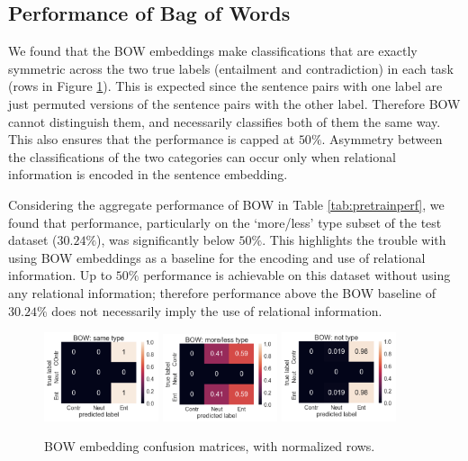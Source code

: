 \subsection{Performance of Bag of Words}
We found that the BOW embeddings make classifications that are exactly symmetric across the two true labels (entailment and contradiction) in each task (rows in Figure \ref{fig:BOWhist}). This is expected since the sentence pairs with one label are just permuted versions of the sentence pairs with the other label. Therefore BOW cannot distinguish them, and necessarily classifies both of them the same way. This also ensures that the performance is capped at $50\%$. Asymmetry between the classifications of the two categories can occur only when relational information is encoded in the sentence embedding.

Considering the aggregate performance of BOW in Table \ref{tab:pretrainperf}, we found that performance, particularly on the `more/less' type subset of the test dataset ($30.24\%$), was significantly below $50\%$. This highlights the trouble with using BOW embeddings as a baseline for the encoding and use of relational information. Up to $50\%$ performance is achievable on this dataset without using any relational information; therefore performance above the BOW baseline of $30.24\%$ does not necessarily imply the use of relational information.

\begin{figure}[ht!]
\centering
\includegraphics[width=0.30\textwidth]{figures/bow-same-large}
\includegraphics[width=0.30\textwidth]{figures/bow-ml-large-5}
\includegraphics[width=0.30\textwidth]{figures/bow-not-large-5}

\caption{BOW embedding confusion matrices, with normalized rows.}

\label{fig:BOWhist}
\end{figure}

